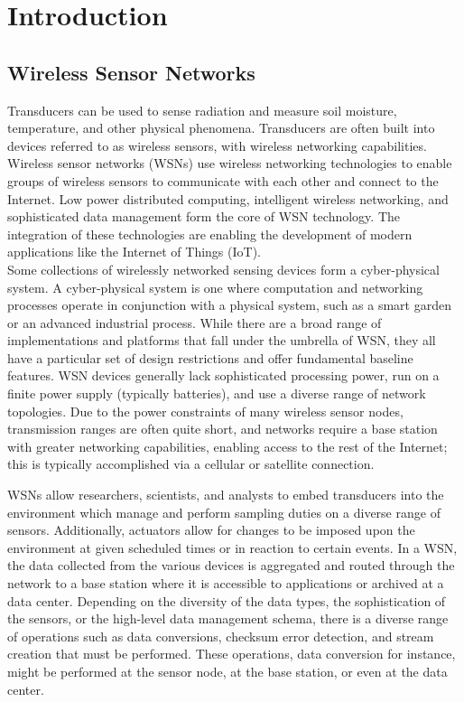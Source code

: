 
\chapter{Introduction} %
\label{Chapter 1}
\lhead{} %

\section{Wireless Sensor Networks}

Transducers can be used to sense radiation and measure soil moisture, temperature, and other physical phenomena. Transducers are often built into devices referred to as wireless sensors, with wireless networking capabilities. Wireless sensor networks (WSNs) use wireless networking technologies to enable groups of wireless sensors to communicate with each other and connect to the Internet. Low power distributed computing, intelligent wireless networking, and sophisticated data management form the core of WSN technology. The integration of these technologies are enabling the development of modern applications like the Internet of Things (IoT).\\ 

Some collections of wirelessly networked sensing devices form a cyber-physical system. A cyber-physical system is one where computation and networking processes operate in conjunction with a physical system, such as a smart garden or an advanced industrial process. While there are a broad range of implementations and platforms that fall under the umbrella of WSN, they all have a particular set of design restrictions and offer fundamental baseline features. WSN devices generally lack sophisticated processing power, run on a finite power supply (typically batteries), and use a diverse range of network topologies. Due to the power constraints of many wireless sensor nodes, transmission ranges are often quite short, and networks require a base station with greater networking capabilities, enabling access to the rest of the Internet; this is  typically accomplished via a cellular or satellite connection. 

WSNs allow researchers, scientists, and analysts to embed transducers into the environment which manage and perform sampling duties on a diverse range of sensors. Additionally, actuators allow for changes to be imposed upon the environment at given scheduled times or in reaction to certain events. In a WSN, the data collected from the various devices is aggregated and routed through the network to a base station where it is accessible to applications or archived at a data center. Depending on the diversity of the data types, the sophistication of the sensors, or the high-level data management schema, there is a diverse range of operations such as data conversions, checksum error detection, and stream creation that must be performed. These operations, data conversion for instance, might be performed at the sensor node, at the base station, or even at the data center. 

